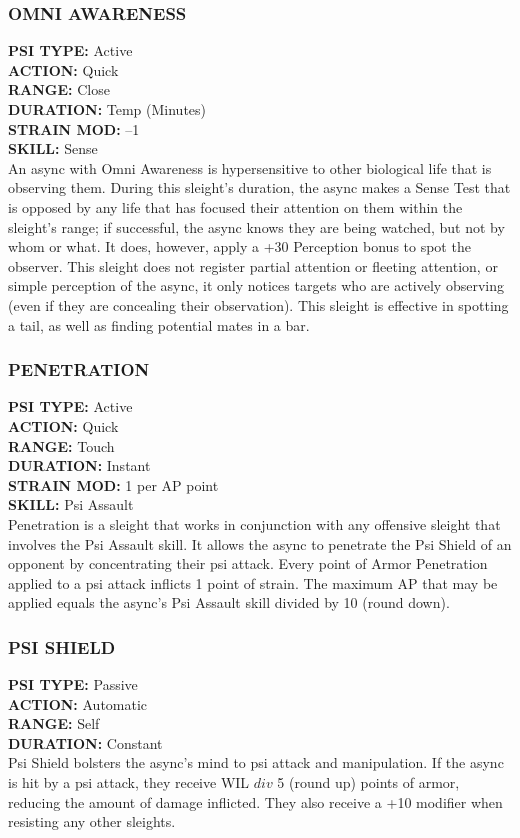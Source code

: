 \subsubsection{OMNI AWARENESS}
\textbf{PSI TYPE:} Active \\ 
\textbf{ACTION:} Quick \\ 
\textbf{RANGE:} Close \\ 
\textbf{DURATION:} Temp (Minutes) \\
\textbf{STRAIN MOD:} –1 \\ 
\textbf{SKILL:} Sense\\
An async with Omni Awareness is hypersensitive to
other biological life that is observing them. During
this sleight’s duration, the async makes a Sense Test
that is opposed by any life that has focused their attention
on them within the sleight’s range; if successful,
the async knows they are being watched, but not
by whom or what. It does, however, apply a +30 Perception
bonus to spot the observer. This sleight does
not register partial attention or fleeting attention, or
simple perception of the async, it only notices targets
who are actively observing (even if they are concealing
their observation). This sleight is effective in spotting a
tail, as well as finding potential mates in a bar.

\subsubsection{PENETRATION}
\textbf{PSI TYPE:} Active \\ 
\textbf{ACTION:} Quick \\ 
\textbf{RANGE:} Touch \\ 
\textbf{DURATION:} Instant \\
\textbf{STRAIN MOD:} 1 per AP point \\ 
\textbf{SKILL:} Psi Assault \\
Penetration is a sleight that works in conjunction with
any offensive sleight that involves the Psi Assault skill.
It allows the async to penetrate the Psi Shield of an opponent
by concentrating their psi attack. Every point
of Armor Penetration applied to a psi attack inflicts
1 point of strain. The maximum AP that may be applied
equals the async’s Psi Assault skill divided by 10
(round down).

\subsubsection{PSI SHIELD}
\textbf{PSI TYPE:} Passive \\ 
\textbf{ACTION:} Automatic \\ 
\textbf{RANGE:} Self \\ 
\textbf{DURATION:} Constant \\
Psi Shield bolsters the async’s mind to psi attack and
manipulation. If the async is hit by a psi attack, they
receive WIL $div$ 5 (round up) points of armor, reducing
the amount of damage inflicted. They also receive a
+10 modifier when resisting any other sleights.

